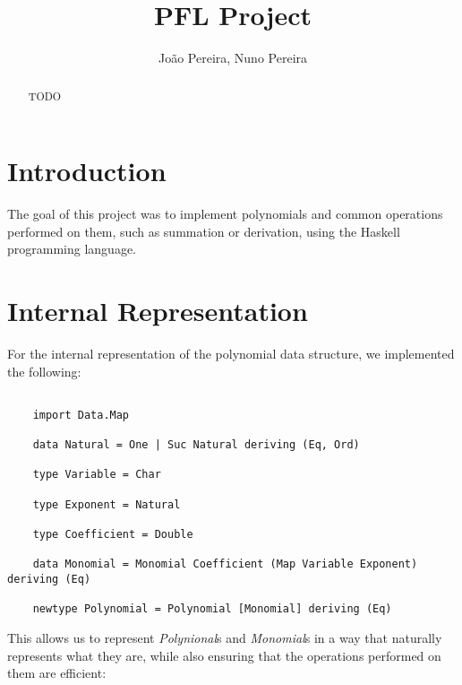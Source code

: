 \documentclass[11pt,a4paper]{article}
\title{PFL Project}
\author{João Pereira, Nuno Pereira}
\begin{document}
    
\maketitle

\pagebreak

\begin{abstract}
    TODO
\end{abstract}

\tableofcontents

\pagebreak

\section{Introduction}

    The goal of this project was to implement polynomials and common operations performed on them, such as summation or derivation, using the Haskell programming language.

\section{Internal Representation}

    For the internal representation of the polynomial data structure, we implemented the following:

    \begin{lstlisting}

    import Data.Map

    data Natural = One | Suc Natural deriving (Eq, Ord)

    type Variable = Char

    type Exponent = Natural

    type Coefficient = Double

    data Monomial = Monomial Coefficient (Map Variable Exponent) deriving (Eq)

    newtype Polynomial = Polynomial [Monomial] deriving (Eq)
    \end{lstlisting}

    This allows us to represent \textit{Polynional}s and \textit{Monomial}s in a way that naturally represents what they are, while also ensuring that the operations performed on them are efficient:
\end{document}
